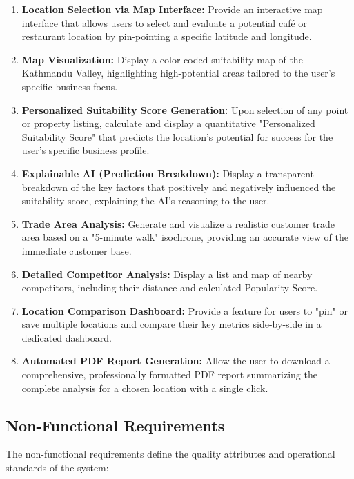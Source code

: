 \begin{enumerate}

    \item[\textbf{a.}] \textbf{Location Selection via Map Interface:} Provide an interactive map interface that allows users to select and evaluate a potential café or restaurant location by pin-pointing a specific latitude and longitude.
    \item[\textbf{b.}] \textbf{Map Visualization:} Display a color-coded suitability map of the Kathmandu Valley, highlighting high-potential areas tailored to the user's specific business focus.
    \item[\textbf{d.}] \textbf{Personalized Suitability Score Generation:} Upon selection of any point or property listing, calculate and display a quantitative "Personalized Suitability Score" that predicts the location's potential for success for the user's specific business profile.
    \item[\textbf{e.}] \textbf{Explainable AI (Prediction Breakdown):} Display a transparent breakdown of the key factors that positively and negatively influenced the suitability score, explaining the AI's reasoning to the user.
    \item[\textbf{f.}] \textbf{Trade Area Analysis:} Generate and visualize a realistic customer trade area based on a "5-minute walk" isochrone, providing an accurate view of the immediate customer base.
    \item[\textbf{g.}] \textbf{Detailed Competitor Analysis:} Display a list and map of nearby competitors, including their distance and calculated Popularity Score.
    \item[\textbf{h.}] \textbf{Location Comparison Dashboard:} Provide a feature for users to "pin" or save multiple locations and compare their key metrics side-by-side in a dedicated dashboard.
    \item[\textbf{i.}] \textbf{Automated PDF Report Generation:} Allow the user to download a comprehensive, professionally formatted PDF report summarizing the complete analysis for a chosen location with a single click.
\end{enumerate}

\subsection{Non-Functional Requirements}
The non-functional requirements define the quality attributes and operational standards of the system:

